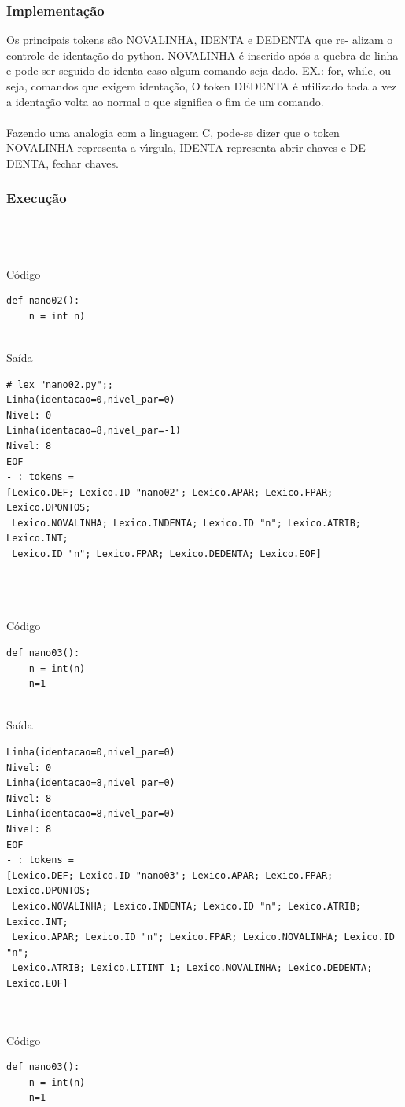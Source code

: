 \documentclass{article}
\begin{document}
\subsubsection{Implementação}
Os principais tokens são NOVALINHA, IDENTA e DEDENTA que re-
alizam o controle de identação do python. NOVALINHA é inserido após
a quebra de linha e pode ser seguido do identa caso algum comando seja
dado. EX.: for, while, ou seja, comandos que exigem identação, O token
DEDENTA é utilizado toda a vez a identação volta ao normal o que significa
o fim de um comando.\\\\
Fazendo uma analogia com a linguagem C, pode-se dizer que o token
NOVALINHA representa a vı́rgula, IDENTA representa abrir chaves e DE-
DENTA, fechar chaves.
\subsubsection{Execução}
\\\\\\Código    
\begin{lstlisting}
def nano02():
	n = int n)
\end{lstlisting}

\\Saída
\begin{lstlisting}
# lex "nano02.py";;
Linha(identacao=0,nivel_par=0)
Nivel: 0
Linha(identacao=8,nivel_par=-1)
Nivel: 8
EOF
- : tokens =
[Lexico.DEF; Lexico.ID "nano02"; Lexico.APAR; Lexico.FPAR; Lexico.DPONTOS;
 Lexico.NOVALINHA; Lexico.INDENTA; Lexico.ID "n"; Lexico.ATRIB; Lexico.INT;
 Lexico.ID "n"; Lexico.FPAR; Lexico.DEDENTA; Lexico.EOF]
\end{lstlisting}
\\\\\\Código
\begin{lstlisting}
def nano03():
	n = int(n)
	n=1
\end{lstlisting}

\\Saída
\begin{lstlisting}
Linha(identacao=0,nivel_par=0)
Nivel: 0
Linha(identacao=8,nivel_par=0)
Nivel: 8
Linha(identacao=8,nivel_par=0)
Nivel: 8
EOF
- : tokens =
[Lexico.DEF; Lexico.ID "nano03"; Lexico.APAR; Lexico.FPAR; Lexico.DPONTOS;
 Lexico.NOVALINHA; Lexico.INDENTA; Lexico.ID "n"; Lexico.ATRIB; Lexico.INT;
 Lexico.APAR; Lexico.ID "n"; Lexico.FPAR; Lexico.NOVALINHA; Lexico.ID "n";
 Lexico.ATRIB; Lexico.LITINT 1; Lexico.NOVALINHA; Lexico.DEDENTA; Lexico.EOF]
\end{lstlisting}
\\
\\
Código
\begin{lstlisting}
def nano03():
	n = int(n)
	n=1
\end{lstlisting}
\end{document}
